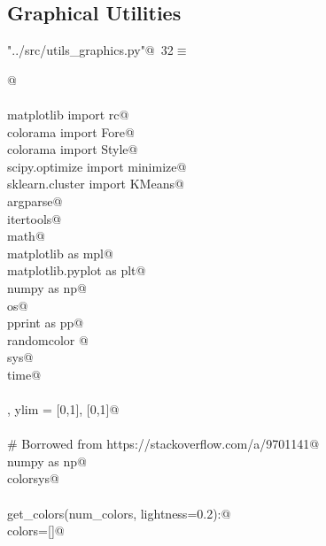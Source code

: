 \documentclass[10.0pt]{report}
\begin{document}
\begin{appendices}
\section{Graphical Utilities}


\begin{flushleft} \small\label{scrap14}\raggedright\small
{} \verb@"../src/utils_graphics.py"@\nobreak\ {\footnotesize {32}}$\equiv$
\vspace{-1ex}
\begin{list}{}{} \item
\mbox{}\verb@    @\\
\mbox{}\verb@@\\
\mbox{}\verb@from matplotlib import rc@\\
\mbox{}\verb@from colorama import Fore@\\
\mbox{}\verb@from colorama import Style@\\
\mbox{}\verb@from scipy.optimize import minimize@\\
\mbox{}\verb@from sklearn.cluster import KMeans@\\
\mbox{}\verb@import argparse@\\
\mbox{}\verb@import itertools@\\
\mbox{}\verb@import math@\\
\mbox{}\verb@import matplotlib as mpl@\\
\mbox{}\verb@import matplotlib.pyplot as plt@\\
\mbox{}\verb@import numpy as np@\\
\mbox{}\verb@import os@\\
\mbox{}\verb@import pprint as pp@\\
\mbox{}\verb@import randomcolor @\\
\mbox{}\verb@import sys@\\
\mbox{}\verb@import time@\\
\mbox{}\verb@@\\
\mbox{}\verb@xlim, ylim = [0,1], [0,1]@\\
\mbox{}\verb@@\\
\mbox{}\verb@# Borrowed from https://stackoverflow.com/a/9701141@\\
\mbox{}\verb@import numpy as np@\\
\mbox{}\verb@import colorsys@\\
\mbox{}\verb@@\\
\mbox{}\verb@def get_colors(num_colors, lightness=0.2):@\\
\mbox{}\verb@    colors=[]@\\

\end{list}
\end{flushleft}
\end{appendices}
\end{document}
